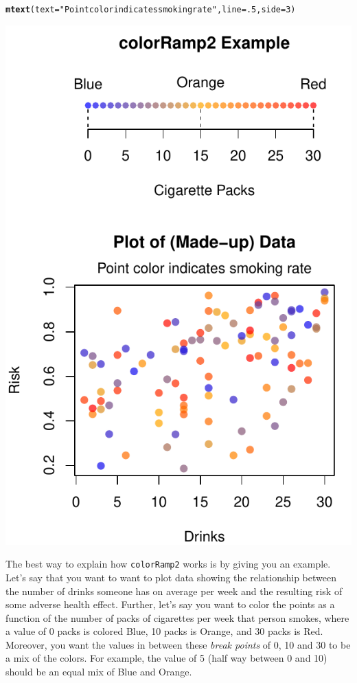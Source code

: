 \documentclass{tufte-book}\usepackage[]{graphicx}\usepackage[]{color}
\makeatletter
\def\maxwidth{ %
  \ifdim\Gin@nat@width>\linewidth
    \linewidth
  \else
    \Gin@nat@width
  \fi
}
\newcommand{\hlnum}[1]{\textcolor[rgb]{0.686,0.059,0.569}{#1}}%
\newcommand{\hlstr}[1]{\textcolor[rgb]{0.192,0.494,0.8}{#1}}%
\newcommand{\hlstd}[1]{\textcolor[rgb]{0.345,0.345,0.345}{#1}}%
\newcommand{\hlkwc}[1]{\textcolor[rgb]{0.333,0.667,0.333}{#1}}%
\newcommand{\hlkwd}[1]{\textcolor[rgb]{0.737,0.353,0.396}{\textbf{#1}}}%
\newenvironment{kframe}{%
 \def\at@end@of@kframe{}%
 \ifinner\ifhmode%
  \def\at@end@of@kframe{\end{minipage}}%
  \begin{minipage}{\columnwidth}%
 \fi\fi%
 \def\FrameCommand##1{\hskip\@totalleftmargin \hskip-\fboxsep
 \colorbox{shadecolor}{##1}\hskip-\fboxsep
     \hskip-\linewidth \hskip-\@totalleftmargin \hskip\columnwidth}%
 \MakeFramed {\advance\hsize-\width
   \@totalleftmargin\z@ \linewidth\hsize
   \@setminipage}}%
 {\par\unskip\endMakeFramed%
 \at@end@of@kframe}
\newenvironment{knitrout}{}{} %
\makeatother
\begin{document}
\begin{footnotesize}
\begin{marginfigure}
\begin{tiny}
\begin{knitrout}
\begin{kframe}
\begin{alltt}
\hlkwd{mtext}\hlstd{(}\hlkwc{text} \hlstd{=} \hlstr{"Point color indicates smoking rate"}\hlstd{,} \hlkwc{line} \hlstd{=} \hlnum{.5}\hlstd{,} \hlkwc{side} \hlstd{=} \hlnum{3}\hlstd{)}
\end{alltt}
\end{kframe}
\includegraphics[width=\maxwidth]{figure/unnamed-chunk-172-1} 

\end{knitrout}
\end{tiny}
\label{fig:colorramp}
\end{marginfigure}


The best way to explain how \texttt{colorRamp2} works is by giving you an example. Let's say that you want to want to plot data showing the relationship between the number of drinks someone has on average per week and the resulting risk of some adverse health effect. Further, let's say you want to color the points as a function of the number of packs of cigarettes per week that person smokes, where a value of 0 packs is colored Blue, 10 packs is Orange, and 30 packs is Red. Moreover, you want the values in between these \textit{break points} of 0, 10 and 30 to be a mix of the colors. For example, the value of 5 (half way between 0 and 10) should be an equal mix of Blue and Orange.


\end{footnotesize}
\end{document}

